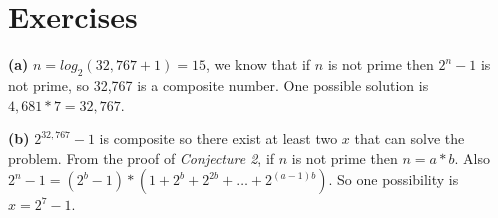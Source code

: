 \section{Exercises}


\sol \textbf{(a)} $n = log_2(32,767+1) = 15$, we know that if $n$ is not prime then $2^n - 1$ is not prime, so 32,767 is a composite number. 
One possible solution is $4,681 * 7 = 32,767$.

\sol \textbf{(b)} $2^{32,767} - 1$ is composite so there exist at least two $x$ that can solve the problem.
From the proof of \textit{Conjecture 2}, if $n$ is not prime then $n = a*b$.
Also $2^n - 1 = (2^b - 1) * (1 + 2^b + 2^{2b} + \ldots + 2^{(a-1)b})$.
So one possibility is $x = 2^7 - 1$.

